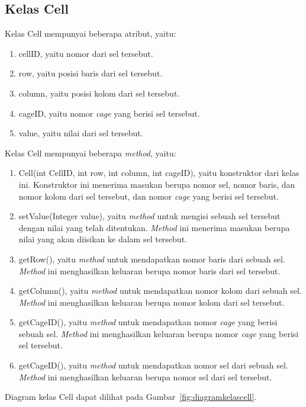 \subsection{Kelas Cell}
\label{sec:kelascell}

Kelas Cell mempunyai beberapa atribut, yaitu:

\begin{enumerate}
\item cellID, yaitu nomor dari sel tersebut.
\item row, yaitu posisi baris dari sel tersebut.
\item column, yaitu posisi kolom dari sel tersebut.
\item cageID, yaitu nomor \textit{cage} yang berisi sel tersebut.
\item value, yaitu nilai dari sel tersebut.
\end{enumerate}

Kelas Cell mempunyai beberapa \textit{method}, yaitu:

\begin{enumerate}
\item Cell(int CellID, int row, int column, int cageID), yaitu konstruktor dari kelas ini. Konstruktor ini menerima masukan berupa nomor sel, nomor baris, dan nomor kolom dari sel tersebut, dan nomor \textit{cage} yang berisi sel tersebut.
\item setValue(Integer value), yaitu \textit{method} untuk mengisi sebuah sel tersebut dengan nilai yang telah ditentukan. \textit{Method} ini menerima masukan berupa nilai yang akan diisikan ke dalam sel tersebut.
\item getRow(), yaitu \textit{method} untuk mendapatkan nomor baris dari sebuah sel. \textit{Method} ini menghasilkan keluaran berupa nomor baris dari sel tersebut.
\item getColumn(), yaitu \textit{method} untuk mendapatkan nomor kolom dari sebuah sel. \textit{Method} ini menghasilkan keluaran berupa nomor kolom dari sel tersebut.
\item getCageID(), yaitu \textit{method} untuk mendapatkan nomor \textit{cage} yang berisi sebuah sel. \textit{Method} ini menghasilkan keluaran berupa nomor \textit{cage} yang berisi sel tersebut.
\item getCageID(), yaitu \textit{method} untuk mendapatkan nomor sel dari sebuah sel. \textit{Method} ini menghasilkan keluaran berupa nomor sel dari sel tersebut.
\end{enumerate}

Diagram kelas Cell dapat dilihat pada Gambar~\ref{fig:diagramkelascell}.

